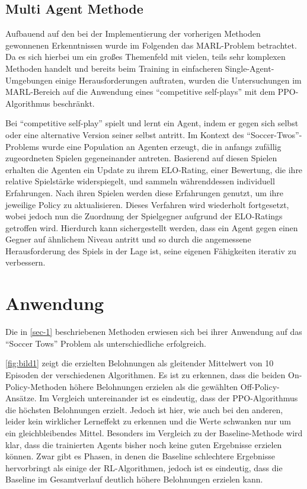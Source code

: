 \documentclass[twocolumn]{webofc}
\begin{document}
\subsection{Multi Agent Methode}

Aufbauend auf den bei der Implementierung der vorherigen Methoden gewonnenen Erkenntnissen wurde im Folgenden das \ac{MARL}-Problem betrachtet. Da es sich hierbei um ein großes Themenfeld mit vielen, teils sehr komplexen Methoden handelt und bereits beim Training in einfacheren Single-Agent-Umgebungen einige Herausforderungen auftraten, wurden die Untersuchungen im \ac{MARL}-Bereich auf die Anwendung eines \enquote{competitive self-plays} mit dem \ac{PPO}-Algorithmus beschränkt.

Bei \enquote{competitive self-play} spielt und lernt ein Agent, indem er gegen sich selbst oder eine alternative Version seiner selbst antritt. Im Kontext des \enquote{Soccer-Twos}-Problems wurde eine Population an Agenten erzeugt, die in anfangs zufällig zugeordneten Spielen gegeneinander antreten. Basierend auf diesen Spielen erhalten die Agenten ein Update zu ihrem ELO-Rating, einer Bewertung, die ihre relative Spielstärke widerspiegelt, und sammeln währenddessen individuell Erfahrungen. Nach ihren Spielen werden diese Erfahrungen genutzt, um ihre jeweilige Policy zu aktualisieren. Dieses Verfahren wird wiederholt fortgesetzt, wobei jedoch nun die Zuordnung der Spielgegner aufgrund der ELO-Ratings getroffen wird. Hierdurch kann sichergestellt werden, dass ein Agent gegen einen Gegner auf ähnlichem Niveau antritt und so durch die angemessene Herausforderung des Spiels in der Lage ist, seine eigenen Fähigkeiten iterativ zu verbessern.

\section{Anwendung} \label{sec-2}

Die in \ref{sec-1} beschriebenen Methoden erwiesen sich bei ihrer Anwendung auf das \enquote{Soccer Tows} Problem als unterschiedliche erfolgreich.


\ref{fig:bild1} zeigt die erzielten Belohnungen als gleitender Mittelwert von 10 Episoden der verschiedenen Algorithmen. Es ist zu erkennen, dass die beiden On-Policy-Methoden höhere Belohnungen erzielen als die gewählten Off-Policy-Ansätze. Im Vergleich untereinander ist es eindeutig, dass der \ac{PPO}-Algorithmus die höchsten Belohnungen erzielt. Jedoch ist hier, wie auch bei den anderen, leider kein wirklicher Lerneffekt zu erkennen und die Werte schwanken nur um ein gleichbleibendes Mittel.
Besonders im Vergleich zu der Baseline-Methode wird klar, dass die trainierten Agents bisher noch keine guten Ergebnisse erzielen können. Zwar gibt es Phasen, in denen die Baseline schlechtere Ergebnisse hervorbringt als einige der \ac{RL}-Algorithmen, jedoch ist es eindeutig, dass die Baseline im Gesamtverlauf deutlich höhere Belohnungen erzielen kann.
\end{document}
